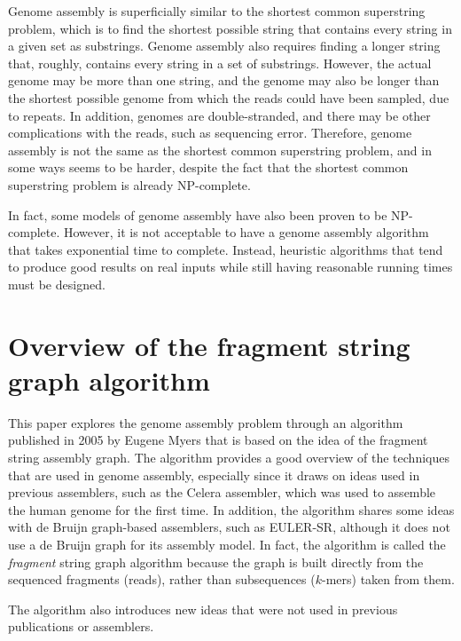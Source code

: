 \documentclass[12pt]{article}
\begin{document}
Genome assembly is superficially similar to the shortest common superstring
problem, which is to find the shortest possible string that contains every
string in a given set as substrings.  Genome assembly also requires finding a
longer string that, roughly, contains every string in  a set of substrings.
However, the actual genome may be more than one string, and the genome may also
be longer than the shortest possible genome from which the reads could have been
sampled, due to repeats.  In addition,  genomes are double-stranded, and there
may be other complications with the reads, such as sequencing error.  Therefore,
genome assembly is not the same as the shortest common superstring problem, and
in some ways seems to be harder, despite the fact that the shortest common
superstring problem is already NP-complete\cite{Turner1989}.

In fact, some models of genome assembly have also been proven to be
NP-complete\cite{Medvedev2007}.  However, it is not acceptable to have a genome
assembly algorithm that takes exponential time to complete.  Instead, heuristic
algorithms that tend to produce good results on real inputs while still having
reasonable running times must be designed.

\section{Overview of the fragment string graph algorithm}

This paper explores the genome assembly problem through an algorithm published
in 2005 by Eugene Myers that is based on the idea of the fragment string
assembly graph\cite{Myers2005}.  The algorithm provides a good overview of the
techniques that are used in genome assembly, especially since it draws on ideas
used in previous assemblers, such as the Celera assembler, which was used to
assemble the human genome for the first time\cite{Venter2001}.  In addition, the
algorithm shares some ideas with de Bruijn graph-based assemblers, such as
EULER-SR\cite{Pevzner2001}, although it does not use a de Bruijn graph for its
assembly model.  In fact, the algorithm is called the {\em fragment} string
graph algorithm because the graph is built directly from the sequenced fragments
(reads), rather than subsequences ($k$-mers) taken from them.

The algorithm also introduces new ideas that were not used in previous
publications or assemblers.
\end{document}
